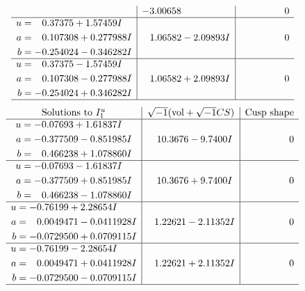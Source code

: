 \documentclass[1p]{elsarticle_modified}
\theoremstyle{definition}
\newcommand{\I}{\sqrt{-1}}
\begin{document}
$$\begin{array}{c|c|c}
 & -3.00658\phantom{ +0.000000I} & \phantom{-0.000000 } 0 \\ \hline\begin{aligned}
u &= \phantom{-}0.37375 + 1.57459 I \\
a &= \phantom{-}0.107308 + 0.277988 I \\
b &= -0.254024 - 0.346282 I\end{aligned}
 & \phantom{-}1.06582 - 2.09893 I & \phantom{-0.000000 } 0 \\ \hline\begin{aligned}
u &= \phantom{-}0.37375 - 1.57459 I \\
a &= \phantom{-}0.107308 - 0.277988 I \\
b &= -0.254024 + 0.346282 I\end{aligned}
 & \phantom{-}1.06582 + 2.09893 I & \phantom{-0.000000 } 0\\
 \hline 
 \end{array}$$\newpage$$\begin{array}{c|c|c}  
\text{Solutions to }I^u_{1}& \I (\text{vol} + \sqrt{-1}CS) & \text{Cusp shape}\\
 \hline 
\begin{aligned}
u &= -0.07693 + 1.61837 I \\
a &= -0.377509 - 0.851985 I \\
b &= \phantom{-}0.466238 + 1.078860 I\end{aligned}
 & \phantom{-}10.3676 - 9.7400 I & \phantom{-0.000000 } 0 \\ \hline\begin{aligned}
u &= -0.07693 - 1.61837 I \\
a &= -0.377509 + 0.851985 I \\
b &= \phantom{-}0.466238 - 1.078860 I\end{aligned}
 & \phantom{-}10.3676 + 9.7400 I & \phantom{-0.000000 } 0 \\ \hline\begin{aligned}
u &= -0.76199 + 2.28654 I \\
a &= \phantom{-}0.0049471 - 0.0411928 I \\
b &= -0.0729500 + 0.0709115 I\end{aligned}
 & \phantom{-}1.22621 - 2.11352 I & \phantom{-0.000000 } 0 \\ \hline\begin{aligned}
u &= -0.76199 - 2.28654 I \\
a &= \phantom{-}0.0049471 + 0.0411928 I \\
b &= -0.0729500 - 0.0709115 I\end{aligned}
 & \phantom{-}1.22621 + 2.11352 I & \phantom{-0.000000 } 0\\
 \hline 
 \end{array}$$\newpage\newpage\renewcommand{\arraystretch}{1}
\end{document}
